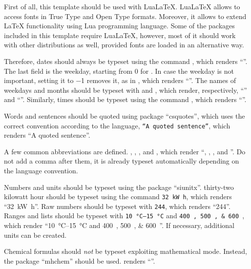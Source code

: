 First of all, this template should be used with Lua\LaTeX{}.
Lua\LaTeX{} allows to access fonts in True Type and Open Type formats.
Moreover, it allows to extend \LaTeX{} functionality using Lua programming language.
Some of the packages included in this template require Lua\LaTeX{}, however, most of it should work with other distributions as well, provided fonts are loaded in an alternative way.

Therefore, dates should always be typeset using the command \texttt{}, which renders \enquote{}.
The last field is the weekday, starting from \num{0} for .
In case the weekday is not important, setting it to \num{-1} removes it, as in \texttt{}, which renders \enquote{}.
The names of weekdays and months should be typeset with \texttt{} and \texttt{}, which render, respectively, \enquote{} and \enquote{}.
Similarly, times should be typeset using the command \texttt{}, which renders \enquote{}.

Words and sentences should be quoted using package \enquote{csquotes}, which uses the correct convention according to the language, \eg
\texttt{\enquote{A quoted sentence}}, which renders \enquote{A quoted sentence}.

A few common abbreviations are defined.
\Eg \texttt{\Eg}, \texttt{\eg}, \texttt{\Ie}, \texttt{\ie} and \texttt{\phd}, which render \enquote{\Eg, \eg, \Ie, \ie and \phd}.
Do not add a comma after them, it is already typeset automatically depending on the language convention.

Numbers and units should be typeset using the package \enquote{siunitx}.
\Eg thirty-two kilowatt hour should be typeset using the command \texttt{\SI{32}{\kilo\watt\hour}}, which renders \enquote{\SI{32}{\kilo\watt\hour}}.
Raw numbers should be typeset with \texttt{\num{244}}, which renders \enquote{\num{244}}.
Ranges and lists should be typeset with \texttt{\SIrange{10}{15}{\celsius}} and \texttt{\SIlist{400;500;600}{\ppm}}, which render \enquote{\SIrange{10}{15}{\celsius} and \SIlist{400;500;600}{\ppm}}.
If necessary, additional units can be created.

Chemical formulas should \emph{not} be typeset exploiting mathematical mode.
Instead, the package \enquote{mhchem} should be used.
\texttt{} renders \enquote{}.

